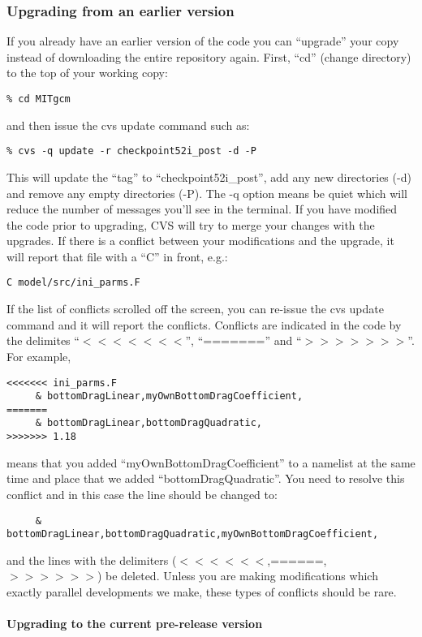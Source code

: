 \subsubsection{Upgrading from an earlier version}

If you already have an earlier version of the code you can ``upgrade''
your copy instead of downloading the entire repository again. First,
``cd'' (change directory) to the top of your working copy:
\begin{verbatim}
% cd MITgcm
\end{verbatim}
and then issue the cvs update command such as:
\begin{verbatim}
% cvs -q update -r checkpoint52i_post -d -P
\end{verbatim}
This will update the ``tag'' to ``checkpoint52i\_post'', add any new
directories (-d) and remove any empty directories (-P). The -q option
means be quiet which will reduce the number of messages you'll see in
the terminal. If you have modified the code prior to upgrading, CVS
will try to merge your changes with the upgrades. If there is a
conflict between your modifications and the upgrade, it will report
that file with a ``C'' in front, e.g.:
\begin{verbatim}
C model/src/ini_parms.F
\end{verbatim}
If the list of conflicts scrolled off the screen, you can re-issue the
cvs update command and it will report the conflicts. Conflicts are
indicated in the code by the delimites ``$<<<<<<<$'', ``======='' and
``$>>>>>>>$''. For example,
{\small
\begin{verbatim}
<<<<<<< ini_parms.F
     & bottomDragLinear,myOwnBottomDragCoefficient,
=======
     & bottomDragLinear,bottomDragQuadratic,
>>>>>>> 1.18
\end{verbatim}
}
means that you added ``myOwnBottomDragCoefficient'' to a namelist at
the same time and place that we added ``bottomDragQuadratic''. You
need to resolve this conflict and in this case the line should be
changed to:
{\small
\begin{verbatim}
     & bottomDragLinear,bottomDragQuadratic,myOwnBottomDragCoefficient,
\end{verbatim}
}
and the lines with the delimiters ($<<<<<<$,======,$>>>>>>$) be deleted.
Unless you are making modifications which exactly parallel
developments we make, these types of conflicts should be rare.

\paragraph*{Upgrading to the current pre-release version}

